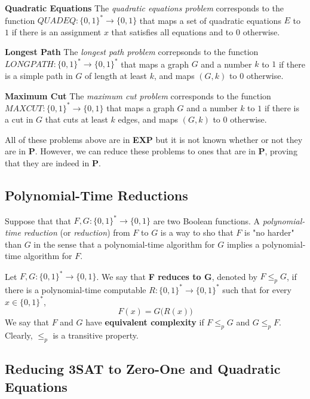   \textbf{Quadratic Equations} The \textit{quadratic equations problem} corresponds to the function $QUADEQ: \{0,1\}^* \longrightarrow \{0,1\}$ that maps a set of quadratic equations $E$ to $1$ if there is an assignment $x$ that satisfies all equations and to $0$ otherwise. 

  \textbf{Longest Path} The \textit{longest path problem} correpsonds to the function $LONGPATH: \{0,1\}^* \longrightarrow \{0,1\}^*$ that maps a graph $G$ and a number $k$ to $1$ if there is a simple path in $G$ of length at least $k$, and maps $(G, k)$ to $0$ otherwise. 

  \textbf{Maximum Cut} The \textit{maximum cut problem} corresponds to the function $MAXCUT: \{0,1\}^* \longrightarrow \{0,1\}$ that maps a graph $G$ and a number $k$ to $1$ if there is a cut in $G$ that cuts at least $k$ edges, and maps $(G, k)$ to $0$ otherwise. 

  All of these problems above are in \textbf{EXP} but it is not known whether or not they are in \textbf{P}. However, we can reduce these problems to ones that are in \textbf{P}, proving that they are indeed in \textbf{P}. 

\subsection{Polynomial-Time Reductions}

  Suppose that that $F, G: \{0,1\}^* \longrightarrow \{0,1\}$ are two Boolean functions. A \textit{polynomial-time reduction} (or \textit{reduction}) from $F$ to $G$ is a way to sho that $F$ is "no harder" than $G$ in the sense that a polynomial-time algorithm for $G$ implies a polynomial-time algorithm for $F$. 

  \begin{definition}
  Let $F, G: \{0,1\}^* \longrightarrow \{0,1\}$. We say that \textbf{F reduces to G}, denoted by $F \leq_p G$, if there is a polynomial-time computable $R: \{0,1\}^* \longrightarrow \{0,1\}^*$ such that for every $x \in \{0,1\}^*$, 
  \[F(x) = G \big(R(x)\big)\]
  We say that $F$ and $G$ have \textbf{equivalent complexity} if $F \leq_p G$ and $G \leq_p F$. Clearly, $\leq_p$ is a transitive property. 
  \end{definition}

\subsection{Reducing 3SAT to Zero-One and Quadratic Equations}

